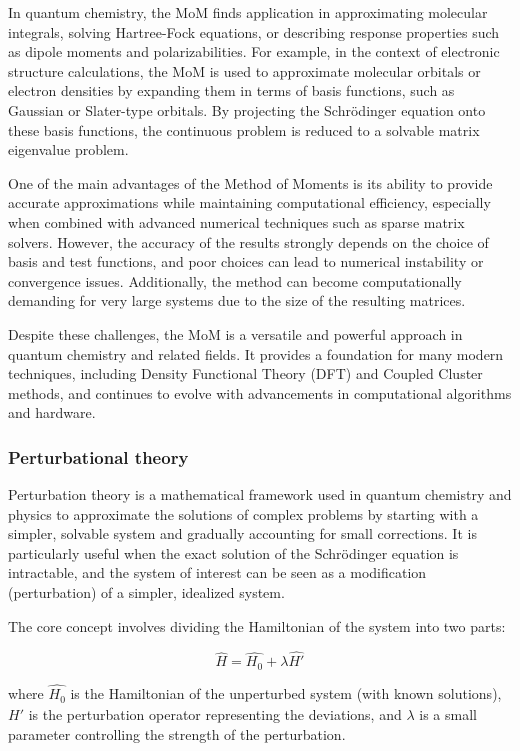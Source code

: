 In quantum chemistry, the MoM finds application in approximating molecular integrals, solving Hartree-Fock equations, or describing response properties such as dipole moments and polarizabilities. For example, in the context of electronic structure calculations, the MoM is used to approximate molecular orbitals or electron densities by expanding them in terms of basis functions, such as Gaussian or Slater-type orbitals. By projecting the Schrödinger equation onto these basis functions, the continuous problem is reduced to a solvable matrix eigenvalue problem.

One of the main advantages of the Method of Moments is its ability to provide accurate approximations while maintaining computational efficiency, especially when combined with advanced numerical techniques such as sparse matrix solvers. However, the accuracy of the results strongly depends on the choice of basis and test functions, and poor choices can lead to numerical instability or convergence issues. Additionally, the method can become computationally demanding for very large systems due to the size of the resulting matrices.

Despite these challenges, the MoM is a versatile and powerful approach in quantum chemistry and related fields. It provides a foundation for many modern techniques, including Density Functional Theory (DFT) and Coupled Cluster methods, and continues to evolve with advancements in computational algorithms and hardware.

\subsubsection{Perturbational theory}

Perturbation theory is a mathematical framework used in quantum chemistry and physics to approximate the solutions of complex problems by starting with a simpler, solvable system and gradually accounting for small corrections. It is particularly useful when the exact solution of the Schrödinger equation is intractable, and the system of interest can be seen as a modification (perturbation) of a simpler, idealized system.

The core concept involves dividing the Hamiltonian of the system into two parts:

\begin{equation}
	\hat{H} = \hat{H_0} + \lambda \hat{H'}
\end{equation}

where $\hat{H_0}$ is the Hamiltonian of the unperturbed system (with known solutions), $\hat{H'}$ is the perturbation operator representing the deviations, and $\lambda$ is a small parameter controlling the strength of the perturbation.

